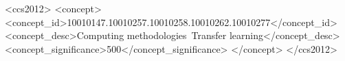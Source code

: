 \begin{CCSXML}
  <ccs2012>
  <concept>
  <concept_id>10010147.10010257.10010258.10010262.10010277</concept_id>
  <concept_desc>Computing methodologies~Transfer learning</concept_desc>
  <concept_significance>500</concept_significance>
  </concept>
  </ccs2012>
  \end{CCSXML}
  
